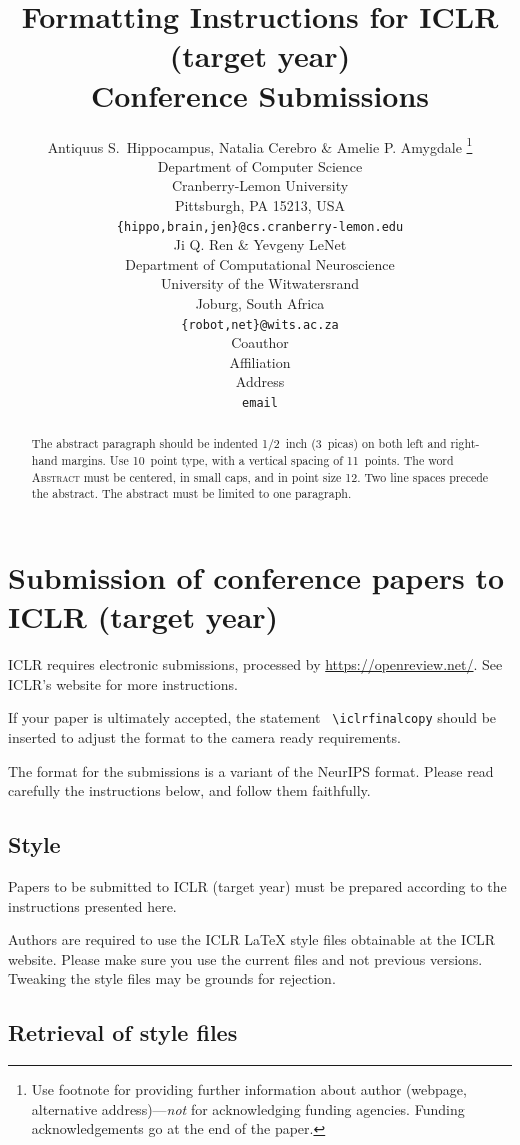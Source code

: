 \documentclass{article} %
\title{Formatting Instructions for ICLR (target year) \\ Conference Submissions}
\author{Antiquus S.~Hippocampus, Natalia Cerebro \& Amelie P. Amygdale \thanks{ Use footnote for providing further information
about author (webpage, alternative address)---\emph{not} for acknowledging
funding agencies.  Funding acknowledgements go at the end of the paper.} \\
Department of Computer Science\\
Cranberry-Lemon University\\
Pittsburgh, PA 15213, USA \\
\texttt{\{hippo,brain,jen\}@cs.cranberry-lemon.edu} \\
\And
Ji Q. Ren \& Yevgeny LeNet \\
Department of Computational Neuroscience \\
University of the Witwatersrand \\
Joburg, South Africa \\
\texttt{\{robot,net\}@wits.ac.za} \\
\AND
Coauthor \\
Affiliation \\
Address \\
\texttt{email}
}
\begin{document}
\maketitle

\begin{abstract}
The abstract paragraph should be indented 1/2~inch (3~picas) on both left and
right-hand margins. Use 10~point type, with a vertical spacing of 11~points.
The word \textsc{Abstract} must be centered, in small caps, and in point size 12. Two
line spaces precede the abstract. The abstract must be limited to one
paragraph.
\end{abstract}

\section{Submission of conference papers to ICLR (target year)}

ICLR requires electronic submissions, processed by
\url{https://openreview.net/}. See ICLR's website for more instructions.

If your paper is ultimately accepted, the statement {\tt
  {\textbackslash}iclrfinalcopy} should be inserted to adjust the
format to the camera ready requirements.

The format for the submissions is a variant of the NeurIPS format.
Please read carefully the instructions below, and follow them
faithfully.

\subsection{Style}

Papers to be submitted to ICLR (target year) must be prepared according to the
instructions presented here.


Authors are required to use the ICLR \LaTeX{} style files obtainable at the
ICLR website. Please make sure you use the current files and
not previous versions. Tweaking the style files may be grounds for rejection.

\subsection{Retrieval of style files}
\end{document}
